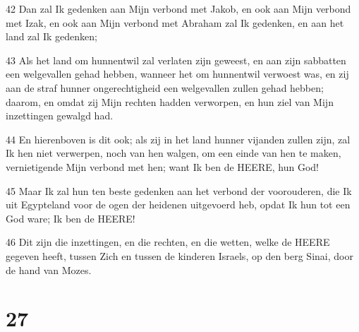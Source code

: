 \par 42 Dan zal Ik gedenken aan Mijn verbond met Jakob, en ook aan Mijn verbond met Izak, en ook aan Mijn verbond met Abraham zal Ik gedenken, en aan het land zal Ik gedenken;
\par 43 Als het land om hunnentwil zal verlaten zijn geweest, en aan zijn sabbatten een welgevallen gehad hebben, wanneer het om hunnentwil verwoest was, en zij aan de straf hunner ongerechtigheid een welgevallen zullen gehad hebben; daarom, en omdat zij Mijn rechten hadden verworpen, en hun ziel van Mijn inzettingen gewalgd had.
\par 44 En hierenboven is dit ook; als zij in het land hunner vijanden zullen zijn, zal Ik hen niet verwerpen, noch van hen walgen, om een einde van hen te maken, vernietigende Mijn verbond met hen; want Ik ben de HEERE, hun God!
\par 45 Maar Ik zal hun ten beste gedenken aan het verbond der voorouderen, die Ik uit Egypteland voor de ogen der heidenen uitgevoerd heb, opdat Ik hun tot een God ware; Ik ben de HEERE!
\par 46 Dit zijn die inzettingen, en die rechten, en die wetten, welke de HEERE gegeven heeft, tussen Zich en tussen de kinderen Israels, op den berg Sinai, door de hand van Mozes.

\chapter{27}

